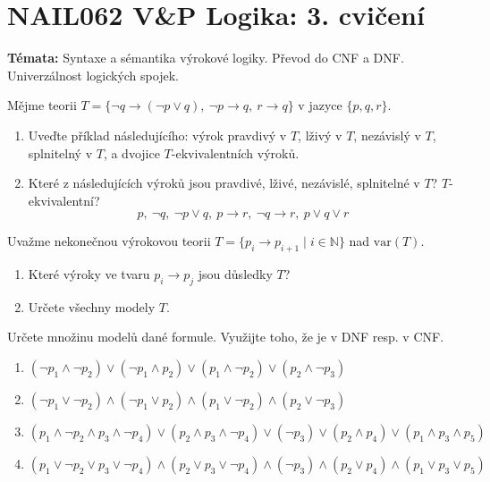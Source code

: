\documentclass[a4paper,12pt]{article}
\begin{document}
\section*{NAIL062 V\&P Logika: 3. cvičení}


\textbf{Témata:} 
Syntaxe a sémantika výrokové logiky. Převod do CNF a DNF. Univerzálnost logických spojek.


\medskip\begin{problem}
    Mějme teorii $T=\{\neg q \to (\neg p \vee q),\ \neg p \to q,\ r \to q\}$ v jazyce $\{p, q, r\}$.
    \begin{enumerate}
        \item Uveďte příklad následujícího: výrok pravdivý v $T$, lživý v $T$, nezávislý v $T$, splnitelný v $T$, a dvojice $T$-ekvivalentních výroků.
        \item Které z následujících výroků jsou pravdivé, lživé, nezávislé, splnitelné v $T$? $T$-ekvivalentní? 
        $$
        p, \ \neg q, \ \neg p\vee q, \ p\to r,\ \neg q\to r, \ p\vee q\vee r
        $$
    \end{enumerate}
\end{problem}


\medskip\begin{problem}
    Uvažme nekonečnou výrokovou teorii $T=\{p_i \to p_{i+1}\mid i\in \mathbb{N}\}$ nad $\mathrm{var}(T)$. 
    \begin{enumerate}
        \item Které výroky ve tvaru  $p_i \to p_j$ jsou důsledky $T$?
        \item Určete všechny modely $T$.
    \end{enumerate}
    \end{problem}
    
    
\medskip\begin{problem} Určete množinu modelů dané formule. Využijte toho, že je v DNF resp. v CNF.
\begin{enumerate}
    \item $(\neg p_1 \wedge \neg p_2)\vee( \neg p_1 \wedge p_2)\vee( p_1 \wedge \neg p_2)\vee( p_2 \wedge \neg p_3)$
    \item $(\neg p_1 \vee \neg p_2)\wedge( \neg p_1 \vee p_2)\wedge( p_1 \vee \neg p_2)\wedge( p_2 \vee \neg p_3)$
    \item $(p_1 \wedge  \neg p_2 \wedge  p_3 \wedge  \neg p_4 )\vee(p_2 \wedge  p_3 \wedge  \neg p_4 )\vee(\neg p_3)\vee(p_2 \wedge  p_4)\vee(p_1 \wedge  p_3 \wedge  p_5 )$
    \item $(p_1 \vee \neg p_2 \vee p_3 \vee \neg p_4 )\wedge(p_2 \vee p_3 \vee \neg p_4 )\wedge(\neg p_3)\wedge(p_2 \vee p_4)\wedge(p_1 \vee p_3 \vee p_5 )$
\end{enumerate}
\end{problem}
    
\end{document}

